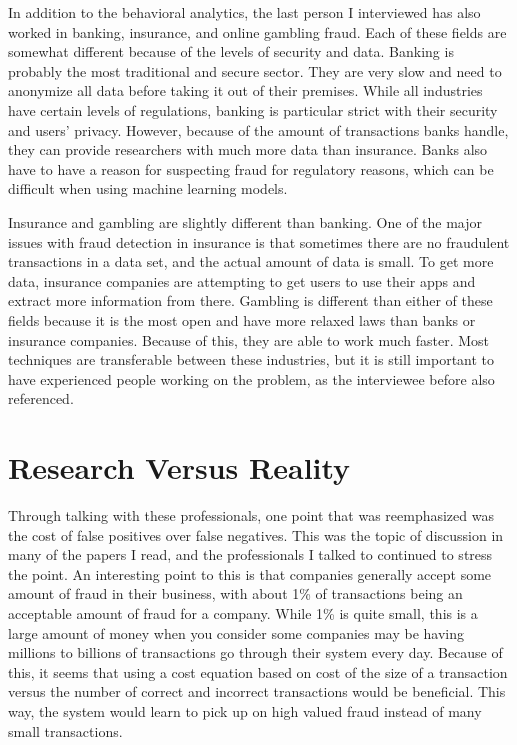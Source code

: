 \documentclass[midd]{thesis}
\begin{document}
In addition to the behavioral analytics, the last person I interviewed has also worked in banking, insurance, and online gambling fraud. Each of these fields are somewhat different because of the levels of security and data. Banking is probably the most traditional and secure sector. They are very slow and need to anonymize all data before taking it out of their premises. While all industries have certain levels of regulations, banking is particular strict with their security and users' privacy. However, because of the amount of transactions banks handle, they can provide researchers with much more data than insurance. Banks also have to have a reason for suspecting fraud for regulatory reasons, which can be difficult when using machine learning models. 

Insurance and gambling are slightly different than banking. One of the major issues with fraud detection in insurance is that sometimes there are no fraudulent transactions in a data set, and the actual amount of data is small. To get more data, insurance companies are attempting to get users to use their apps and extract more information from there. Gambling is different than either of these fields because it is the most open and have more relaxed laws than banks or insurance companies. Because of this, they are able to work much faster. Most techniques are transferable between these industries, but it is still important to have experienced people working on the problem, as the interviewee before also referenced. 


\section{ Research Versus Reality}

Through talking with these professionals, one point that was reemphasized was the cost of false positives over false negatives. This was the topic of discussion in many of the papers I read, and the professionals I talked to continued to stress the point. An interesting point to this is that companies generally accept some amount of fraud in their business, with about 1\% of transactions being an acceptable amount of fraud for a company. While 1\% is quite small, this is a large amount of money when you consider some companies may be having millions to billions of transactions go through their system every day. Because of this, it seems that using a cost equation based on cost of the size of a transaction versus the number of correct and incorrect transactions would be beneficial. This way, the system would learn to pick up on high valued fraud instead of many small transactions.
\end{document}
